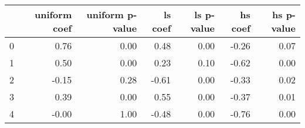 \begin{tabular}{lrrrrrr}
\toprule
 & uniform coef & uniform p-value & ls coef & ls p-value & hs coef & hs p-value \\
\midrule
0 & 0.76 & 0.00 & 0.48 & 0.00 & -0.26 & 0.07 \\
1 & 0.50 & 0.00 & 0.23 & 0.10 & -0.62 & 0.00 \\
2 & -0.15 & 0.28 & -0.61 & 0.00 & -0.33 & 0.02 \\
3 & 0.39 & 0.00 & 0.55 & 0.00 & -0.37 & 0.01 \\
4 & -0.00 & 1.00 & -0.48 & 0.00 & -0.76 & 0.00 \\
\bottomrule
\end{tabular}
